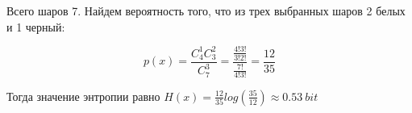 \documentclass[../main.tex]{subfiles}
\begin{document}
Всего шаров 7. Найдем вероятность того, что из трех выбранных шаров 2 белых и 1 черный:

$$p(x)=\frac{C^{1}_{4}C^{2}_{3}}{C^{3}_{7}}=\frac{\frac{4!3!}{3!2!}}{\frac{7!}{4!3!}}=\frac{12}{35}$$

Тогда значение энтропии равно $H(x)=\frac{12}{35}log(\frac{35}{12}) \approx 0.53 \ bit$
\end{document}
